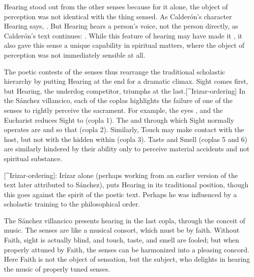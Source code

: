 Hearing stood out from the other senses because for it alone, the object of perception was not identical with the thing sensed.
As Calderón's character Hearing says, .
\Autocite[]{Calderon:Retiro}
But Hearing hears a person's voice, not the person directly, as Calderón's text continues: .
\Autocite[]{Calderon:Retiro}
While this feature of hearing may have made it , it also gave this sense a unique capability in spiritual matters, where the object of perception was not immediately sensible at all.

The poetic contests of the senses thus rearrange the traditional scholastic hierarchy by putting Hearing at the end for a dramatic climax.
Sight comes first, but Hearing, the underdog competitor, triumphs at the last.[^Irizar-ordering]  In the Sánchez villancico, each of the coplas highlights the failure of one of the senses to rightly perceive the sacrament.
For example, the eyes , and the Eucharist reduces Sight to  (copla 1).
The  and  through which Sight normally operates are   and  so that  (copla 2).
Similarly, Touch may make contact with the host, but not with the  hidden within (copla 3).
Taste and Smell (coplas 5 and 6) are similarly hindered by their ability only to perceive material accidents and not spiritual substance.

[^Irizar-ordering]:  Irízar alone (perhaps working from an earlier version of the text later attributed to Sánchez), puts Hearing in its traditional position, though this goes against the spirit of the poetic text.
Perhaps he was influenced by a scholastic training to  the philosophical order.

The Sánchez villancico presents hearing in the last copla, through the conceit of music.
The senses are  like a musical consort, which must be  by faith.
Without Faith, sight is actually blind, and touch, taste, and smell are fooled; but when properly attuned by Faith, the senses can be harmonized into a pleasing concord.
Here Faith is not the object of sensation, but the subject, who delights in hearing the music of properly tuned senses.


